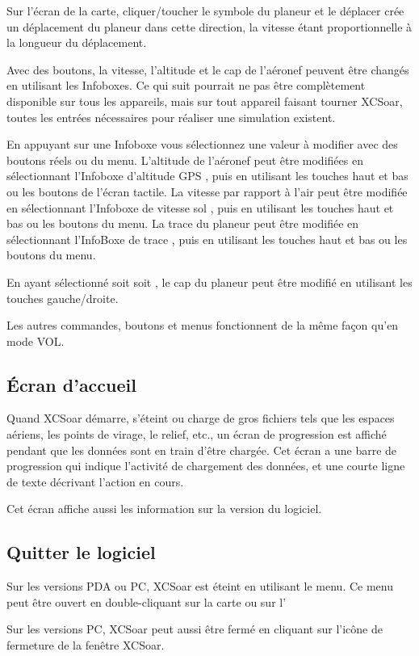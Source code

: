 Sur l'écran de la carte, cliquer/toucher le symbole du planeur
et le déplacer crée un déplacement du planeur dans cette direction, la
vitesse étant proportionnelle à la longueur du déplacement.

Avec des boutons, la vitesse, l'altitude et le cap de l'aéronef
peuvent être changés en utilisant les Infoboxes.
Ce qui suit pourrait ne pas être complètement disponible sur tous les appareils, mais sur
tout appareil faisant tourner XCSoar, toutes les entrées nécessaires pour
réaliser une simulation existent.

En appuyant sur une Infoboxe vous sélectionnez une valeur à modifier avec des boutons
réels ou du menu.
L'altitude de l'aéronef peut être modifiées en sélectionnant l'Infoboxe
d'altitude GPS , puis en utilisant les touches haut et bas ou les boutons
de l'écran tactile.
La vitesse par rapport à l'air peut être modifiée en sélectionnant l'Infoboxe de vitesse sol
, puis en utilisant les touches haut et bas ou les boutons du menu.
La trace du planeur peut être modifiée en sélectionnant l'InfoBoxe de trace 
, puis en utilisant les touches haut et bas ou les boutons du menu.

En ayant sélectionné soit  soit ,
le cap du planeur peut être modifié en utilisant les touches gauche/droite.

Les autres commandes, boutons et menus fonctionnent de la même façon qu'en mode VOL.


\subsection*{Écran d'accueil}
Quand XCSoar démarre, s'éteint ou charge de gros fichiers tels que les espaces aériens,
les points de virage, le relief, etc., un écran de progression est affiché pendant que les données sont
en train d'être chargée. Cet écran a une barre de progression qui indique l'activité
de chargement des données, et une courte ligne de texte décrivant l'action en cours.

Cet écran affiche aussi les information sur la version du logiciel.

\subsection*{Quitter le logiciel}
Sur les versions PDA ou PC, XCSoar est éteint en utilisant le menu. Ce menu peut être
ouvert en double-cliquant sur la carte ou sur l'\InfoBox 
\begin{quote}
\end{quote}

Sur les versions PC, XCSoar peut aussi être fermé en cliquant sur l'icône de fermeture
de la fenêtre XCSoar.
